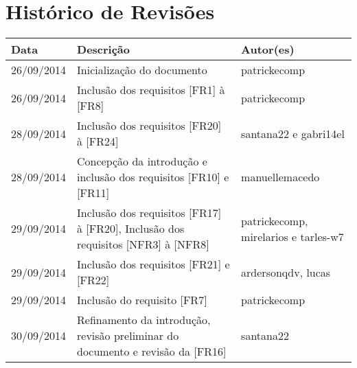 \documentclass{article}
\begin{document}
		
\capa
			

\section*{\center Histórico de Revisões}
	\vspace*{1cm}
	\begin{table}[ht]
		\centering
		\begin{tabular}[pos]{|m{2cm} | m{7.2cm} | m{3.8cm}|} \hline \cellcolor[gray]{0.9}

\textbf{Data} & \cellcolor[gray]{0.9}\textbf{Descrição} & \cellcolor[gray]{0.9} \textbf{Autor(es)}\\ \hline

\small 26/09/2014 & \small Inicialização do documento & \small patrickecomp \\ \hline      

\small 26/09/2014 & \small Inclusão dos requisitos [FR1] à [FR8] & \small patrickecomp \\ \hline 

\small 28/09/2014 & \small Inclusão dos requisitos [FR20] à [FR24] & \small santana22 e gabri14el \\ \hline

\small 28/09/2014 & \small Concepção da introdução e inclusão dos requisitos [FR10] e [FR11] & \small manuellemacedo \\ \hline 

\small 29/09/2014 & \small Inclusão dos requisitos [FR17] à [FR20], Inclusão dos requisitos [NFR3] à [NFR8] & \small patrickecomp, mirelarios e tarles-w7 \\ \hline    

\small 29/09/2014 & \small Inclusão dos requisitos [FR21] e [FR22] & \small ardersonqdv, lucas \\ \hline   

\small 29/09/2014 & \small Inclusão do requisito [FR7] & \small patrickecomp \\ \hline 

\small 30/09/2014 & \small Refinamento da introdução,  revisão preliminar do documento e revisão da [FR16] & \small santana22 \\ \hline


\end{tabular}
\end{table}
\end{document}
